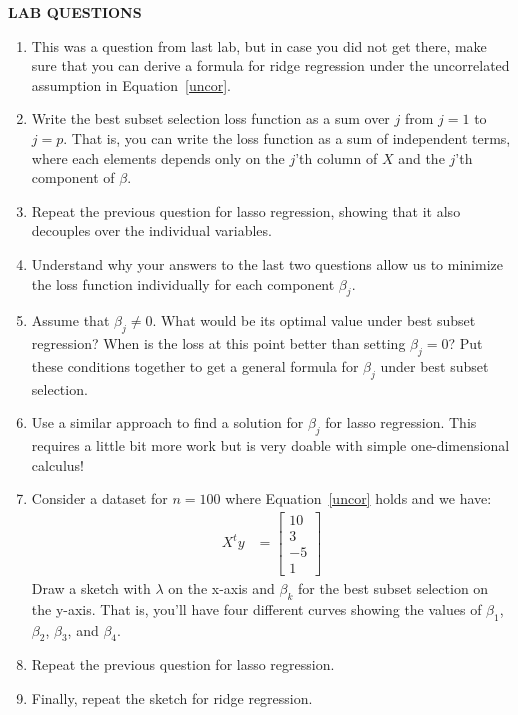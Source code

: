 \documentclass[12pt,hidelinks]{article}
\numberwithin{equation}{section}
\begin{document}
\newpage

\textbf{LAB QUESTIONS}

\vspace*{0pt}

\begin{enumerate}
\item This was a question from last lab, but in case you did not get there,
make sure that you can derive a formula for ridge regression under the uncorrelated
assumption in Equation~\ref{uncor}.
\item Write the best subset selection loss function as a sum over $j$ from $j=1$
to $j=p$. That is, you can write the loss function as a sum of independent terms,
where each elements depends only on the $j$'th column of $X$ and the $j$'th component
of $\beta$.
\item Repeat the previous question for lasso regression, showing that it also
decouples over the individual variables.
\item Understand why your answers to the last two questions allow us to minimize
the loss function individually for each component $\beta_j$.
\item Assume that $\beta_j \neq 0$. What would be its optimal value under best
subset regression? When is the loss at this point better than setting $\beta_j = 0$?
Put these conditions together to get a general formula for $\beta_j$ under best
subset selection.
\item Use a similar approach to find a solution for $\beta_j$ for lasso regression.
This requires a little bit more work but is very doable with simple one-dimensional
calculus!
\item Consider a dataset for $n=100$ where Equation~\ref{uncor} holds and we have:
\begin{align}
X^t y &= \begin{bmatrix} 10 \\ 3 \\ -5 \\ 1 \end{bmatrix}
\end{align}
Draw a sketch with $\lambda$ on the x-axis and $\beta_k$ for the best subset selection
on the y-axis. That is, you'll have four different curves showing the values of $\beta_1$,
$\beta_2$, $\beta_3$, and $\beta_4$.
\item Repeat the previous question for lasso regression.
\item Finally, repeat the sketch for ridge regression.
\end{enumerate}
\end{document}
